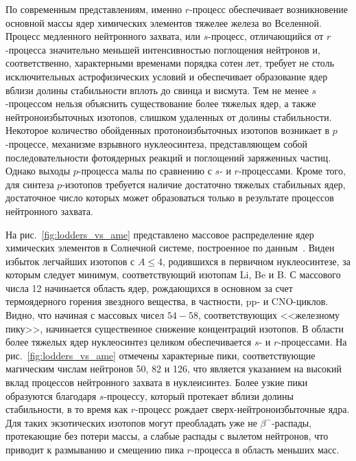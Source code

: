 По современным представлениям, именно $r$-процесс обеспечивает возникновение основной массы ядер химических элементов тяжелее железа во Вселенной. Процесс медленного нейтронного захвата, или $s$-процесс, отличающийся от $r$-процесса значительно меньшей интенсивностью поглощения нейтронов и, соответственно, характерными временами порядка сотен лет, требует не столь исключительных астрофизических условий и обеспечивает образование ядер вблизи долины стабильности вплоть до свинца и висмута. Тем не менее $s$-процессом нельзя объяснить существование более тяжелых ядер, а также нейтроноизбыточных изотопов, слишком удаленных от долины стабильности. Некоторое количество обойденных протоноизбыточных изотопов возникает в $p$-процессе, механизме взрывного нуклеосинтеза, представляющем собой последовательности фотоядерных реакций и поглощений заряженных частиц. Однако выходы $p$-процесса малы по сравнению с $s$- и $r$-процессами. Кроме того, для синтеза $p$-изотопов требуется наличие достаточно тяжелых стабильных ядер, достаточное число которых может образоваться только в результате процессов нейтронного захвата. 

На рис.~\ref{fig:lodders_vs_ame} представлено массовое распределение ядер химических элементов в Солнечной системе, построенное по данным~\cite{lodders2003}. Виден избыток легчайших изотопов с $A \leq 4$, родившихся в первичном нуклеосинтезе, за которым следует минимум, соответствующий изотопам Li, Be и B. С массового числа 12 начинается область ядер, рождающихся в основном за счет термоядерного горения звездного вещества, в частности, pp- и CNO-циклов. Видно, что начиная с массовых чисел $54 - 58$, соответствующих <<железному пику>>, начинается существенное снижение концентраций изотопов. В области более тяжелых ядер нуклеосинтез целиком обеспечивается $s$- и $r$-процессами. На рис.~\ref{fig:lodders_vs_ame} отмечены характерные пики, соответствующие магическим числам нейтронов 50, 82 и 126, что является указанием на высокий вклад процессов нейтронного захвата в нуклеисинтез. Более узкие пики образуются благодаря $s$-процессу, который протекает вблизи долины стабильности, в то время как $r$-процесс рождает сверх-нейтроноизбыточные ядра. Для таких экзотических изотопов могут преобладать уже не $\beta^-$-распады, протекающие без потери массы, а слабые распады с вылетом нейтронов, что приводит к размыванию и смещению пика $r$-процесса в область меньших масс.

